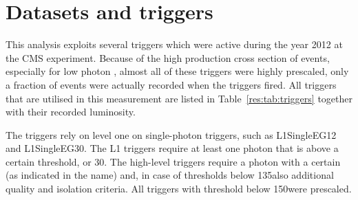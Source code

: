 \section{Datasets and triggers}
\label{res:sec:DatasetsAndTriggers}
This analysis exploits several triggers which were active during the year 2012 at the CMS experiment.
Because of the high production cross section of \GAMJET events, especially for low photon \pt, almost all of these triggers were highly prescaled, \ie only a fraction of events were actually recorded when the triggers fired.
All triggers that are utilised in this measurement are listed in Table~\ref{res:tab:triggers} together with their recorded luminosity.
\renewcommand{\arraystretch}{1.5}
\begin{table}[!hbt]
\centering
\caption{Single-photon triggers together with the recorded luminosity taking the prescales of the triggers into consideration.}
\label{res:tab:triggers}
\end{table}  
The triggers rely on level one on single-photon triggers, such as L1SingleEG12 and L1SingleEG30.
The L1 triggers require at least one photon that is above a certain \pt threshold, \gev or 30\gev.
The high-level triggers require a photon with a certain \pt (as indicated in the name) and, in case of thresholds below 135\gev also additional quality and isolation criteria. 
All triggers with threshold below 150\gev were prescaled.

